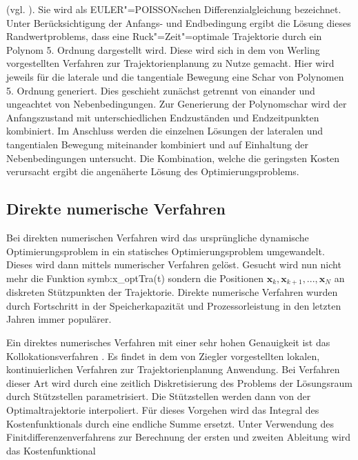 (vgl. \cite{Ziegler2017}). 
Sie wird als EULER"=POISSONschen Differenzialgleichung bezeichnet.
Unter Ber\"ucksichtigung der Anfangs- und Endbedingung ergibt die L\"osung dieses Randwertproblems, dass eine Ruck"=Zeit"=optimale Trajektorie durch ein Polynom 5. Ordnung dargestellt wird.
Diese wird sich in dem von Werling \cite{Werling2011} vorgestellten Verfahren zur Trajektorienplanung zu Nutze gemacht.
Hier wird jeweils f\"ur die laterale und die tangentiale Bewegung eine Schar von Polynomen 5. Ordnung generiert.
Dies geschieht zun\"achst getrennt von einander und ungeachtet von Nebenbedingungen. 
Zur Generierung der Polynomschar wird der Anfangszustand mit unterschiedlichen Endzust\"anden und Endzeitpunkten kombiniert. 
Im Anschluss werden die einzelnen L\"osungen der lateralen und tangentialen Bewegung miteinander kombiniert und auf Einhaltung der Nebenbedingungen untersucht. 
Die Kombination, welche die geringsten Kosten verursacht ergibt die angen\"aherte L\"osung des Optimierungsproblems.



\subsection{Direkte numerische Verfahren}
Bei direkten numerischen Verfahren wird das urspr\"ungliche dynamische Optimierungsproblem in ein statisches Optimierungsproblem umgewandelt. 
Dieses wird dann mittels numerischer Verfahren gel\"ost.
Gesucht wird nun nicht mehr die Funktion \gls{symb:x_optTra}(t) sondern die Positionen \(\pmb{x}_k, \pmb{x}_{k+1}, ..., \pmb{x}_N \) an diskreten St\"utzpunkten der Trajektorie.
Direkte numerische Verfahren wurden durch Fortschritt in der Speicherkapazit\"at und Prozessorleistung in den letzten Jahren immer popul\"arer. \cite{Papageorgiou1991}

Ein direktes numerisches Verfahren mit einer sehr hohen Genauigkeit ist das Kollokationsverfahren \cite{Papageorgiou1991}.
Es findet in dem von Ziegler \cite{Ziegler2017} vorgestellten lokalen, kontinuierlichen Verfahren zur Trajektorienplanung Anwendung. 
Bei Verfahren dieser Art wird durch eine zeitlich Diskretisierung des Problems der L\"osungsraum durch St\"utzstellen parametrisiert.
Die St\"utzstellen werden dann von der Optimaltrajektorie interpoliert.
F\"ur dieses Vorgehen wird das Integral des Kostenfunktionals durch eine endliche Summe ersetzt. 
Unter Verwendung des Finitdifferenzenverfahrens zur Berechnung der ersten und zweiten Ableitung wird das Kostenfunktional


